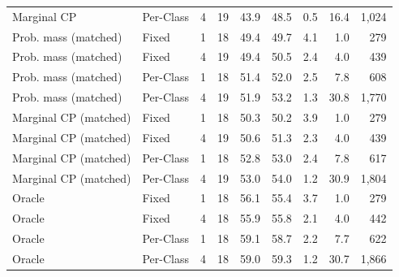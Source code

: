 \begin{tabular}{llrrrrrrr}
Marginal CP & Per-Class & 4 & 19 & 43.9 & 48.5 & 0.5 & 16.4 & 1,024 \\
Prob. mass (matched) & Fixed & 1 & 18 & 49.4 & 49.7 & 4.1 & 1.0 & 279 \\
Prob. mass (matched) & Fixed & 4 & 19 & 49.4 & 50.5 & 2.4 & 4.0 & 439 \\
Prob. mass (matched) & Per-Class & 1 & 18 & 51.4 & 52.0 & 2.5 & 7.8 & 608 \\
Prob. mass (matched) & Per-Class & 4 & 19 & 51.9 & 53.2 & 1.3 & 30.8 & 1,770 \\
Marginal CP (matched) & Fixed & 1 & 18 & 50.3 & 50.2 & 3.9 & 1.0 & 279 \\
Marginal CP (matched) & Fixed & 4 & 19 & 50.6 & 51.3 & 2.3 & 4.0 & 439 \\
Marginal CP (matched) & Per-Class & 1 & 18 & 52.8 & 53.0 & 2.4 & 7.8 & 617 \\
Marginal CP (matched) & Per-Class & 4 & 19 & 53.0 & 54.0 & 1.2 & 30.9 & 1,804 \\
Oracle & Fixed & 1 & 18 & 56.1 & 55.4 & 3.7 & 1.0 & 279 \\
Oracle & Fixed & 4 & 18 & 55.9 & 55.8 & 2.1 & 4.0 & 442 \\
Oracle & Per-Class & 1 & 18 & 59.1 & 58.7 & 2.2 & 7.7 & 622 \\
Oracle & Per-Class & 4 & 18 & 59.0 & 59.3 & 1.2 & 30.7 & 1,866 \\
\bottomrule
\end{tabular}
